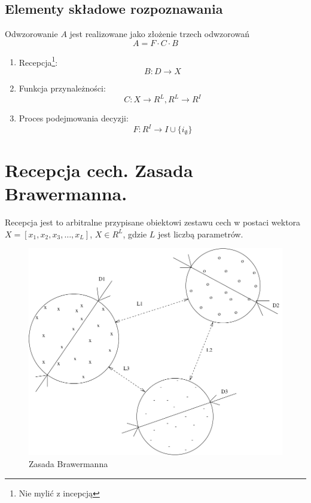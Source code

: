 \documentclass[a4paper,10pt]{article}
\begin{document}
\subsection{Elementy składowe rozpoznawania}
Odwzorowanie $A$ jest realizowane jako złożenie trzech odwzorowań
\begin{equation}
 A = F \cdot C \cdot B
\end{equation}
\begin{enumerate}
 \item Recepcja\footnote{Nie mylić z incepcją}:
    \begin{equation}
      B: D \rightarrow X
    \end{equation}
 \item Funkcja przynależności:
    \begin{equation}
      C: X \rightarrow R^L, R^L \rightarrow R^I
    \end{equation}
  \item Proces podejmowania decyzji:
    \begin{equation}
      F: R^I \rightarrow I \cup \{i_{\emptyset}\}
    \end{equation}
\end{enumerate}

\section{Recepcja cech. Zasada Brawermanna.}
Recepcja jest to arbitralne przypisane obiektowi zestawu cech w postaci wektora $X = [x_1, x_2, x_3, \ldots, x_L]$, $X \in R^L$, gdzie $L$ jest liczbą parametrów.

\begin{figure}[ht]
  \centering
  \includegraphics[width=\textwidth]{brawermann.pdf}
  \caption{Zasada Brawermanna}
  \label{fig:brawermann}
\end{figure}
\end{document}
